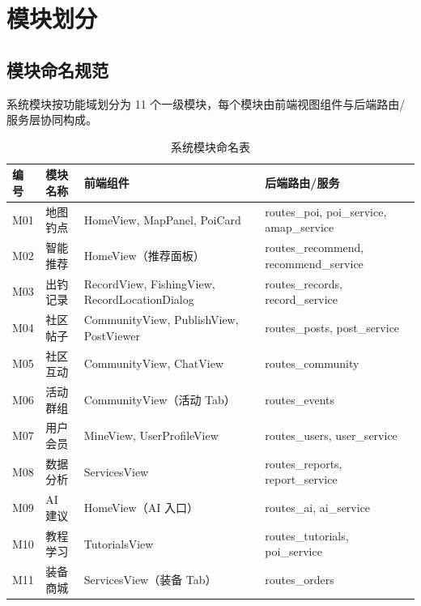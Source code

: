 \documentclass[12pt,a4paper]{ctexart}
\begin{document}
\newpage

\section{模块划分}

\subsection{模块命名规范}

系统模块按功能域划分为 11 个一级模块，每个模块由前端视图组件与后端路由/服务层协同构成。

\begin{table}[H]
  \centering
  \caption{系统模块命名表}
  \label{tab:module-names}
  \begin{tabular}{p{1.5cm}p{2.5cm}p{4cm}p{4cm}}
    \toprule
    \textbf{编号} & \textbf{模块名称} & \textbf{前端组件} & \textbf{后端路由/服务} \\
    \midrule
    M01 & 地图钓点 & HomeView, MapPanel, PoiCard & routes\_poi, poi\_service, amap\_service \\
    M02 & 智能推荐 & HomeView（推荐面板） & routes\_recommend, recommend\_service \\
    M03 & 出钓记录 & RecordView, FishingView, RecordLocationDialog & routes\_records, record\_service \\
    M04 & 社区帖子 & CommunityView, PublishView, PostViewer & routes\_posts, post\_service \\
    M05 & 社区互动 & CommunityView, ChatView & routes\_community \\
    M06 & 活动群组 & CommunityView（活动 Tab） & routes\_events \\
    M07 & 用户会员 & MineView, UserProfileView & routes\_users, user\_service \\
    M08 & 数据分析 & ServicesView & routes\_reports, report\_service \\
    M09 & AI 建议 & HomeView（AI 入口） & routes\_ai, ai\_service \\
    M10 & 教程学习 & TutorialsView & routes\_tutorials, poi\_service \\
    M11 & 装备商城 & ServicesView（装备 Tab） & routes\_orders \\
    \bottomrule
  \end{tabular}
\end{table}
\end{document}
